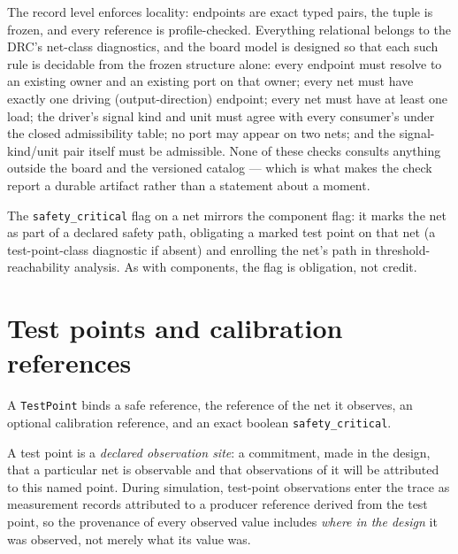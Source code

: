 The record level enforces locality: endpoints are exact typed pairs, the
tuple is frozen, and every reference is profile-checked. Everything
relational belongs to the DRC's net-class diagnostics, and the board
model is designed so that each such rule is decidable from the frozen
structure alone: every endpoint must resolve to an existing owner and an
existing port on that owner; every net must have exactly one driving
(output-direction) endpoint; every net must have at least one load; the
driver's signal kind and unit must agree with every consumer's under the
closed admissibility table; no port may appear on two nets; and the
signal-kind/unit pair itself must be admissible. None of these checks
consults anything outside the board and the versioned catalog --- which
is what makes the check report a durable artifact rather than a
statement about a moment.

The \texttt{safety\_critical} flag on a net mirrors the component flag:
it marks the net as part of a declared safety path, obligating a marked
test point on that net (a test-point-class diagnostic if absent) and
enrolling the net's path in threshold-reachability analysis. As with
components, the flag is obligation, not credit.

\section{Test points and calibration references}\label{ch05:sec:tp}

\begin{definition}
\label{ch05:def:testpoint}
A \texttt{TestPoint} binds a safe reference, the reference of the net it
observes, an optional calibration reference, and an exact boolean
\texttt{safety\_critical}.
\end{definition}

A test point is a \emph{declared observation site}: a commitment, made in
the design, that a particular net is observable and that observations of
it will be attributed to this named point. During simulation, test-point
observations enter the trace as measurement records attributed to a
producer reference derived from the test point, so the provenance of
every observed value includes \emph{where in the design} it was observed,
not merely what its value was.

